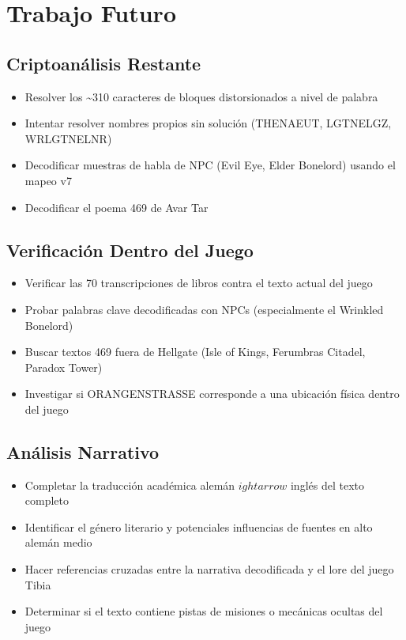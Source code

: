 \documentclass[11pt,a4paper]{article}
\begin{document}
\section{Trabajo Futuro}

\subsection{Criptoan\'{a}lisis Restante}

\begin{itemize}
\item Resolver los \~{}310 caracteres de bloques distorsionados a nivel de palabra
\item Intentar resolver nombres propios sin soluci\'{o}n (THENAEUT, LGTNELGZ, WRLGTNELNR)
\item Decodificar muestras de habla de NPC (Evil Eye, Elder Bonelord) usando el mapeo v7
\item Decodificar el poema 469 de Avar Tar
\end{itemize}

\subsection{Verificaci\'{o}n Dentro del Juego}

\begin{itemize}
\item Verificar las 70 transcripciones de libros contra el texto actual del juego
\item Probar palabras clave decodificadas con NPCs (especialmente el Wrinkled Bonelord)
\item Buscar textos 469 fuera de Hellgate (Isle of Kings, Ferumbras Citadel, Paradox Tower)
\item Investigar si ORANGENSTRASSE corresponde a una ubicaci\'{o}n f\'{i}sica dentro del juego
\end{itemize}

\subsection{An\'{a}lisis Narrativo}

\begin{itemize}
\item Completar la traducci\'{o}n acad\'{e}mica alem\'{a}n $
ightarrow$ ingl\'{e}s del texto completo
\item Identificar el g\'{e}nero literario y potenciales influencias de fuentes en alto alem\'{a}n medio
\item Hacer referencias cruzadas entre la narrativa decodificada y el lore del juego Tibia
\item Determinar si el texto contiene pistas de misiones o mec\'{a}nicas ocultas del juego
\end{itemize}
\end{document}
